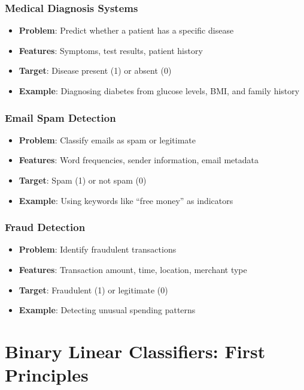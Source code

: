 \subsubsection{Medical Diagnosis Systems}
\begin{itemize}
    \item \textbf{Problem}: Predict whether a patient has a specific disease
    \item \textbf{Features}: Symptoms, test results, patient history
    \item \textbf{Target}: Disease present (1) or absent (0)
    \item \textbf{Example}: Diagnosing diabetes from glucose levels, BMI, and family history
\end{itemize}

\subsubsection{Email Spam Detection}
\begin{itemize}
    \item \textbf{Problem}: Classify emails as spam or legitimate
    \item \textbf{Features}: Word frequencies, sender information, email metadata
    \item \textbf{Target}: Spam (1) or not spam (0)
    \item \textbf{Example}: Using keywords like ``free money'' as indicators
\end{itemize}

\subsubsection{Fraud Detection}
\begin{itemize}
    \item \textbf{Problem}: Identify fraudulent transactions
    \item \textbf{Features}: Transaction amount, time, location, merchant type
    \item \textbf{Target}: Fraudulent (1) or legitimate (0)
    \item \textbf{Example}: Detecting unusual spending patterns
\end{itemize}

\section{Binary Linear Classifiers: First Principles}

